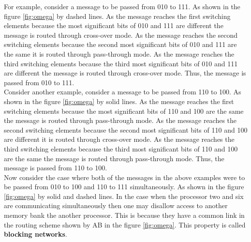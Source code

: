 \documentclass[12pt]{article}
\begin{document}
For example, consider a message to be passed from 010 to 111.
As shown in the figure \ref{fig:omega} by dashed lines. As the message reaches the first switching elements because the most significant bits of 010 and 111 are different
the message is routed through cross-over mode. As the message reaches the second switching elements because the second most significant bits of 010 and 111 are the same it 
is routed through pass-through mode. As the message reaches the third switching elements because the third most significant bits of 010 and 111 are different 
the message is routed through cross-over mode. Thus, the message is passed from 010 to 111. \\
Consider another example, consider a message to be passed from 110 to 100. 
As shown in the figure \ref{fig:omega} by solid lines. As the message reaches the first switching elements because the most significant bits of 110 and 100 are the same
the message is routed through pass-through mode. As the message reaches the second switching elements because the second most significant bits of 110 and 100 are different it
is routed through cross-over mode. As the message reaches the third switching elements because the third most significant bits of 110 and 100 are the same
the message is routed through pass-through mode. Thus, the message is passed from 110 to 100.\\
Now consider the case where both of the messages in the above examples were to be passed from 010 to 100 and 110 to 111 simultaneously.
As shown in the figure \ref{fig:omega} by solid and dashed lines. In the case when the processor two and six are communicating simultaneously
then one may disallow access to another memory bank the another processor. This is because they have a common link in the routing scheme shown by AB in the figure \ref{fig:omega}.
This property is called \textbf{blocking networks}.
\end{document}
